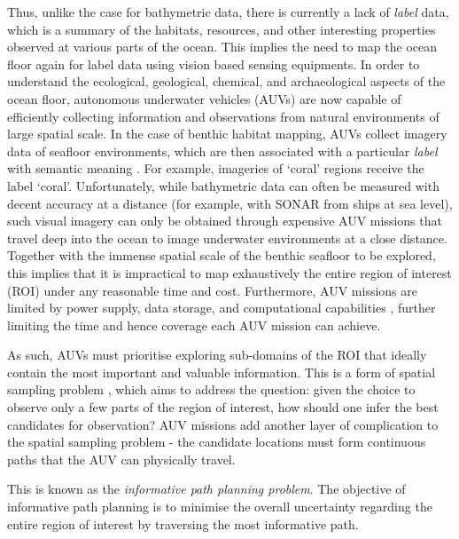 		Thus, unlike the case for bathymetric data, there is currently a lack of \textit{label} data, which is a summary of the habitats, resources, and other interesting properties observed at various parts of the ocean. This implies the need to map the ocean floor again for label data using vision based sensing equipments. In order to understand the ecological, geological, chemical, and archaeological aspects of the ocean floor, autonomous underwater vehicles (AUVs) are now capable of efficiently collecting information and observations from natural environments of large spatial scale. In the case of benthic habitat mapping, AUVs collect imagery data of seafloor environments, which are then associated with a particular \textit{label} with semantic meaning \citep{Steinberg2015128}. For example, imageries of `coral' regions receive the label `coral'. Unfortunately, while bathymetric data can often be measured with decent accuracy at a distance (for example, with SONAR from ships at sea level), such visual imagery can only be obtained through expensive AUV missions that travel deep into the ocean to image underwater environments at a close distance. Together with the immense spatial scale of the benthic seafloor to be explored, this implies that it is impractical to map exhaustively the entire region of interest (ROI) under any reasonable time and cost. Furthermore, AUV missions are limited by power supply, data storage, and computational capabilities \citep{AsherBender}, further limiting the time and hence coverage each AUV mission can achieve. 
		
		As such, AUVs must prioritise exploring sub-domains of the ROI that ideally contain the most important and valuable information. This is a form of spatial sampling problem \citep{Rigby:ROB20372}, which aims to address the question: given the choice to observe only a few parts of the region of interest, how should one infer the best candidates for observation? AUV missions add another layer of complication to the spatial sampling problem - the candidate locations must form continuous paths that the AUV can physically travel.
		
		This is known as the \textit{informative path planning problem}. The objective of informative path planning is to minimise the overall uncertainty regarding the entire region of interest by traversing the most informative path.
		
